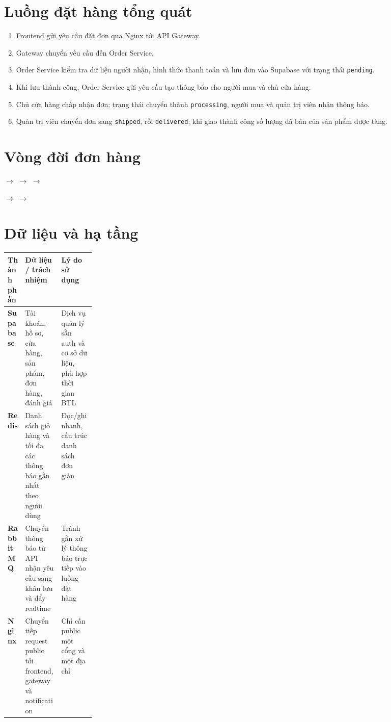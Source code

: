 \documentclass[12pt]{article}
\begin{document}
\section{Luồng đặt hàng tổng quát}
\begin{enumerate}
  \item Frontend gửi yêu cầu đặt đơn qua Nginx tới API Gateway.
  \item Gateway chuyển yêu cầu đến Order Service.
  \item Order Service kiểm tra dữ liệu người nhận, hình thức thanh toán và lưu đơn vào Supabase với trạng thái \texttt{pending}.
  \item Khi lưu thành công, Order Service gửi yêu cầu tạo thông báo cho người mua và chủ cửa hàng.
  \item Chủ cửa hàng chấp nhận đơn; trạng thái chuyển thành \texttt{processing}, người mua và quản trị viên nhận thông báo.
  \item Quản trị viên chuyển đơn sang \texttt{shipped}, rồi \texttt{delivered}; khi giao thành công số lượng đã bán của sản phẩm được tăng.
\end{enumerate}

\section{Vòng đời đơn hàng}
\begin{center}
 $\longrightarrow$  $\longrightarrow$  $\longrightarrow$ 

\vspace{10pt}
 $\longrightarrow$ 
\qquad
{} $\longrightarrow$ 
\end{center}

\section{Dữ liệu và hạ tầng}
\begin{tabularx}{\linewidth}{>{\bfseries}p{0.2\linewidth} X X}
\toprule
Thành phần & Dữ liệu / trách nhiệm & Lý do sử dụng \\
\midrule
Supabase & Tài khoản, hồ sơ, cửa hàng, sản phẩm, đơn hàng, đánh giá & Dịch vụ quản lý sẵn auth và cơ sở dữ liệu, phù hợp thời gian BTL \\
Redis & Danh sách giỏ hàng và tối đa các thông báo gần nhất theo người dùng & Đọc/ghi nhanh, cấu trúc danh sách đơn giản \\
RabbitMQ & Chuyển thông báo từ API nhận yêu cầu sang khâu lưu và đẩy realtime & Tránh gắn xử lý thông báo trực tiếp vào luồng đặt hàng \\
Nginx & Chuyển tiếp request public tới frontend, gateway và notification & Chỉ cần public một cổng và một địa chỉ \\
\bottomrule
\end{tabularx}
\end{document}
